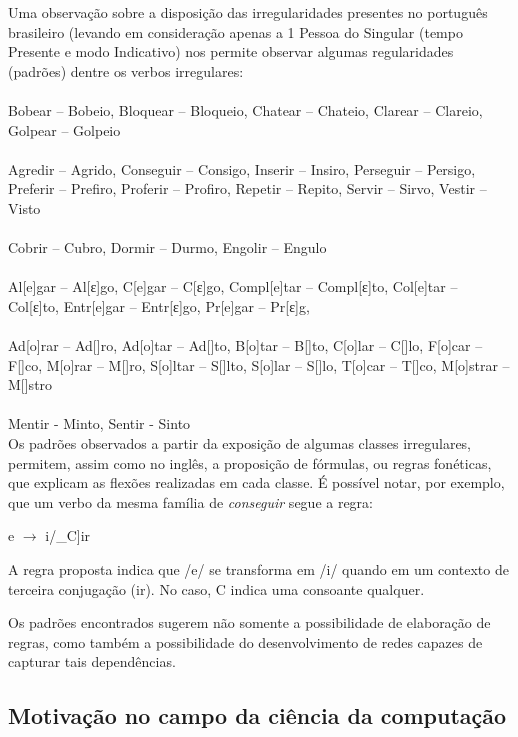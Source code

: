 Uma observação sobre a disposição das irregularidades presentes no português brasileiro (levando em consideração apenas a 1 Pessoa do Singular (tempo Presente e modo Indicativo) nos permite observar algumas regularidades (padrões) dentre os verbos irregulares:\\
\\
Bobear – Bobeio, Bloquear – Bloqueio, Chatear – Chateio, Clarear – Clareio, Golpear – Golpeio\\
\\
Agredir – Agrido, Conseguir – Consigo, Inserir – Insiro, Perseguir – Persigo, Preferir – Prefiro, Proferir – Profiro, Repetir – Repito, Servir –  Sirvo, Vestir – Visto\\
\\
Cobrir – Cubro, Dormir – Durmo, Engolir – Engulo\\
\\
 Al[e]gar – Al[ε]go, C[e]gar – C[ε]go, Compl[e]tar – Compl[ε]to,  Col[e]tar – Col[ε]to, Entr[e]gar – Entr[ε]go, Pr[e]gar – Pr[ε]g,\\
\\
Ad[o]rar – Ad[\textopeno]ro, Ad[o]tar – Ad[\textopeno]to, B[o]tar – B[\textopeno]to, C[o]lar – C[\textopeno]lo, F[o]car – F[\textopeno]co, M[o]rar – M[\textopeno]ro, S[o]ltar – S[\textopeno]lto, S[o]lar – S[\textopeno]lo, T[o]car – T[\textopeno]co, M[o]strar – M[\textopeno]stro\\
\\
Mentir - Minto, Sentir - Sinto\\

Os padrões observados a partir da exposição de algumas classes irregulares, permitem, assim como no inglês, a proposição de fórmulas, ou regras fonéticas, que explicam as flexões realizadas em cada classe. É possível notar, por exemplo, que um verbo da mesma família de \textit{conseguir} segue a regra:

\begin{center}
e $\rightarrow$ i/\_C]ir 
\end{center}

A regra proposta indica que /e/ se transforma em /i/ quando em um contexto de terceira conjugação (ir). No caso, C indica uma consoante qualquer. 

Os padrões encontrados sugerem não somente a possibilidade de elaboração de regras, como também a possibilidade do desenvolvimento de redes capazes de capturar tais dependências. 

\subsection{Motivação no campo da ciência da computação}
\label{sec:compmot}

